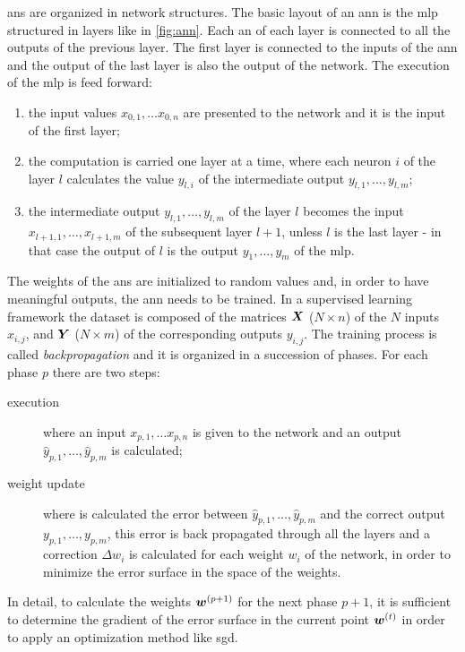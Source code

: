 \acp{an} are organized in network structures. The basic layout of
an  \ac{ann} is the \acf{mlp} structured in layers like in
\cref{fig:ann}. Each \ac{an} of each layer is connected to all the
outputs of the previous layer. The first layer is connected to the
inputs of the \ac{ann} and the output of the last layer is also the
output of the network. The execution of the \ac{mlp} is feed forward:
\begin{enumerate}
\item the input values $x_{0,1},\dots x_{0,n}$ are presented to the
  network and it is the input of the first layer;
\item  the computation is 
  carried one layer at a time, where each neuron $i$ of the layer $l$
  calculates the value $y_{l,i}$ of the intermediate output
  $y_{l,1},\dots,y_{l,m}$;
\item the intermediate output $y_{l,1},\dots,y_{l,m}$ of the layer $l$
  becomes the 
  input $x_{l+1,1},\dots,x_{l+1,m}$ of the subsequent layer $l+1$,
  unless $l$ is the last layer - in that case the output of $l$ is the
  output $y_1,\dots,y_m$ of the \ac{mlp}.
\end{enumerate}

The weights of the \acp{an} are initialized to random values and, in order
to have meaningful outputs, the \ac{ann} needs to be trained. In a
supervised learning framework the dataset is composed of the matrices
$\bm{X}$ ($N\times n$) of the $N$ inputs $x_{i,j}$, and $\bm{Y}$
($N\times m$) of 
the corresponding outputs $y_{i,j}$. The
training process is called \emph{backpropagation} and it is organized in a
succession of phases. For each phase $p$ there are two steps:
\begin{description}
\item[execution] where an input $x_{p,1},\dots x_{p,n}$ is given to
  the network and an output $\hat{y}_{p,1},\dots,\hat{y}_{p,m}$ is calculated;
\item[weight update] where is calculated the error between
  $\hat{y}_{p,1},\dots,\hat{y}_{p,m}$ and the correct output
  $y_{p,1},\dots,y_{p,m}$, this error is back propagated through all
  the layers and a correction $\Delta w_i$ is calculated for each weight $w_i$ of
  the network, in
  order to minimize the error surface in the space of the weights.
\end{description}
In detail, to calculate the weights $\bm{w}^{(p+1)}$ for the next
phase $p+1$, it is 
sufficient to determine the gradient of 
the error surface in the current point $\bm{w}^{(t)}$ in order to
apply an optimization method like \ac{sgd}.


